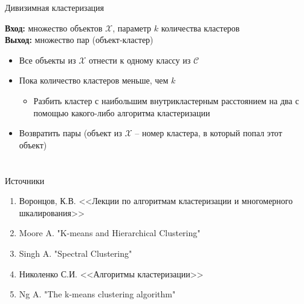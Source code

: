 \documentclass[compress,unicode]{beamer}
\begin{document}
\begin{frame}{Дивизимная кластеризация}{}
\begin{block}{}
\small
{\bf\color{main}Вход:} множество объектов $\mathcal{X}$, параметр $k$ количества кластеров\\
{\bf\color{main}Выход:} множество пар (объект-кластер) \\
\begin{itemize}
	\item Все объекты из $\mathcal{X}$ отнести к одному классу из $\mathcal{C}$
	\item Пока количество кластеров меньше, чем $k$
	\begin{itemize}

		\item Разбить кластер с наибольшим внутрикластерным расстоянием на два с помощью какого-либо алгоритма кластеризации
	\end{itemize}
	\item Возвратить пары (объект из $\mathcal{X}$ -- номер кластера, в который попал этот объект)
\end{itemize}
\end{block}
\end{frame}

\section{}

\begin{frame}{Источники}
\begin{enumerate}
\item Воронцов, К.В. <<Лекции по алгоритмам кластеризации и многомерного шкалирования>>
\item Moore A. "K-means and Hierarchical Clustering"
\item Singh A. "Spectral Clustering"
\item Николенко С.И. <<Алгоритмы кластеризации>>
\item Ng A. "The k-means clustering algorithm"
\end{enumerate}
\end{frame}
\end{document}

